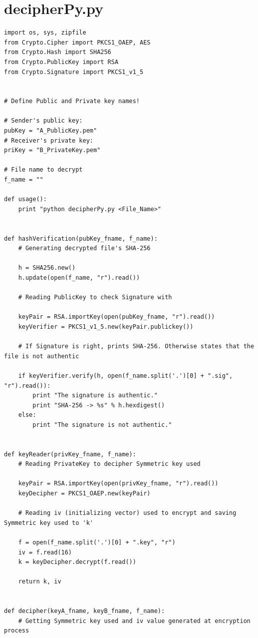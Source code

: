 \documentclass[a4paper,11pt,openright,oneside]{report}
\begin{document}
\newpage
\section{decipherPy.py} \label{App:decipher.py}

\begin{verbatim}
import os, sys, zipfile
from Crypto.Cipher import PKCS1_OAEP, AES
from Crypto.Hash import SHA256
from Crypto.PublicKey import RSA
from Crypto.Signature import PKCS1_v1_5


# Define Public and Private key names!

# Sender's public key:
pubKey = "A_PublicKey.pem"
# Receiver's private key:
priKey = "B_PrivateKey.pem"

# File name to decrypt
f_name = ""

def usage():
    print "python decipherPy.py <File_Name>"


def hashVerification(pubKey_fname, f_name):
    # Generating decrypted file's SHA-256

    h = SHA256.new()
    h.update(open(f_name, "r").read())

    # Reading PublicKey to check Signature with

    keyPair = RSA.importKey(open(pubKey_fname, "r").read())
    keyVerifier = PKCS1_v1_5.new(keyPair.publickey())

    # If Signature is right, prints SHA-256. Otherwise states that the file is not authentic

    if keyVerifier.verify(h, open(f_name.split('.')[0] + ".sig", "r").read()):
        print "The signature is authentic."
        print "SHA-256 -> %s" % h.hexdigest()
    else:
        print "The signature is not authentic."


def keyReader(privKey_fname, f_name):
    # Reading PrivateKey to decipher Symmetric key used

    keyPair = RSA.importKey(open(privKey_fname, "r").read())
    keyDecipher = PKCS1_OAEP.new(keyPair)

    # Reading iv (initializing vector) used to encrypt and saving Symmetric key used to 'k'

    f = open(f_name.split('.')[0] + ".key", "r")
    iv = f.read(16)
    k = keyDecipher.decrypt(f.read())

    return k, iv


def decipher(keyA_fname, keyB_fname, f_name):
    # Getting Symmetric key used and iv value generated at encryption process


\end{verbatim}
\end{document}
